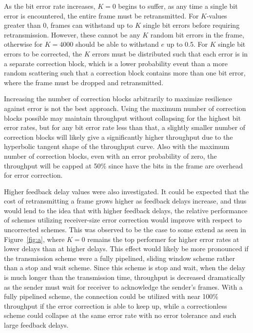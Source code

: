 \documentclass[twocolumn]{article}
\begin{document}
    As the bit error rate increases, $K=0$ begins to suffer, as any time a single bit 
    error is encountered, the entire frame must be retransmitted. For $K$-values greater
    than 0, frames can withstand up to $K$ single bit errors before requiring retransmission. 
    However, these cannot be any $K$ random bit errors in the frame, otherwise for 
    $K=4000$ should be able to withstand $e$ up to 0.5. For $K$ single bit errors to be 
    corrected, the $K$ errors must be distributed such that each error is in a separate 
    correction block, which is a lower probability event than a more random scattering such that
    a correction block contains more than one bit error, where the frame must be dropped and
    retransmitted.

    Increasing the number of correction blocks arbitrarily to maximize resilience against 
    error is not the best approach. Using the maximum number of correction blocks possible
    may maintain throughput without collapsing for the highest bit error rates, but for 
    any bit error rate less than that, a slightly smaller number of correction blocks will 
    likely give a significantly higher throughput due to the hyperbolic tangent shape of the
    throughput curve. Also with the maximum number of correction blocks, even with an error
    probability of zero, the throughput will be capped at 50\% since have the bits in the 
    frame are overhead for error correction.

    Higher feedback delay values were also investigated. It could be expected that the cost
    of retransmitting a frame grows higher as feedback delays increase, and thus would
    lend to the idea that with higher feedback delays, the relative performance of 
    schemes utilizing receiver-size error correction would improve with respect to uncorrected
    schemes. This was observed to be the case to some extend as seen in Figure~\ref{fig:a}, 
    where $K=0$ remains the top performer for higher error rates at lower delays than at higher
    delays. This effect would likely be more pronounced if the transmission scheme were a 
    fully pipelined, sliding window scheme rather than a stop and wait scheme. Since this 
    scheme is stop and wait, when the delay is much longer than the transmission time, 
    throughput is decreased dramatically as the sender must wait for receiver to acknowledge
    the sender's frames. With a fully pipelined scheme, the connection could be utilized with
    near 100\% throughput if the error correction is able to keep up, while a correctionless
    scheme could collapse at the same error rate with no error tolerance and such large feedback
    delays.
\end{document}
